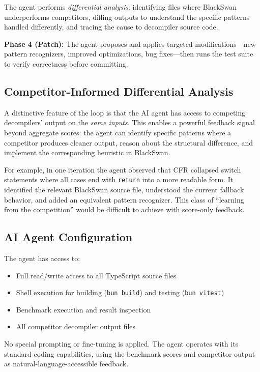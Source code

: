 \documentclass[conference,11pt]{IEEEtran}
\begin{document}
The agent performs \emph{differential analysis}: identifying files where BlackSwan underperforms competitors, diffing outputs to understand the specific patterns handled differently, and tracing the cause to decompiler source code.

\textbf{Phase 4 (Patch):} The agent proposes and applies targeted modifications---new pattern recognizers, improved optimizations, bug fixes---then runs the test suite to verify correctness before committing.

\subsection{Competitor-Informed Differential Analysis}

A distinctive feature of the loop is that the AI agent has access to competing decompilers' output on the \emph{same inputs}. This enables a powerful feedback signal beyond aggregate scores: the agent can identify specific patterns where a competitor produces cleaner output, reason about the structural difference, and implement the corresponding heuristic in BlackSwan.

For example, in one iteration the agent observed that CFR collapsed switch statements where all cases end with \texttt{return} into a more readable form. It identified the relevant BlackSwan source file, understood the current fallback behavior, and added an equivalent pattern recognizer. This class of ``learning from the competition'' would be difficult to achieve with score-only feedback.

\subsection{AI Agent Configuration}

The agent has access to:
\begin{itemize}
    \item Full read/write access to all TypeScript source files
    \item Shell execution for building (\texttt{bun build}) and testing (\texttt{bun vitest})
    \item Benchmark execution and result inspection
    \item All competitor decompiler output files
\end{itemize}

No special prompting or fine-tuning is applied. The agent operates with its standard coding capabilities, using the benchmark scores and competitor output as natural-language-accessible feedback.
\end{document}
